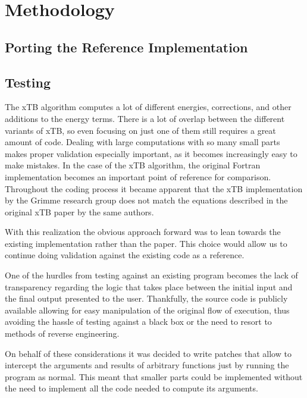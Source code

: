 \chapter{Methodology}

\section{Porting the Reference Implementation}

\section{Testing}

The xTB algorithm computes a lot of different energies, corrections, and other additions to the energy terms. There is a lot of overlap between the different variants of xTB, so even focusing on just one of them still requires a great amount of code.
Dealing with large computations with so many small parts makes proper validation especially important, as it becomes increasingly easy to make mistakes.
In the case of the xTB algorithm, the original Fortran implementation becomes an important point of reference for comparison. Throughout the coding process it became apparent that the xTB implementation by the Grimme research group does not match the equations described in the original xTB paper by the same authors.


With this realization the obvious approach forward was to lean towards the existing implementation rather than the paper. This choice would allow us to continue doing validation against the existing code as a reference.

One of the hurdles from testing against an existing program becomes the lack of transparency regarding the logic that takes place between the initial input and the final output presented to the user. Thankfully, the source code is publicly available allowing for easy manipulation of the original flow of execution, thus avoiding the hassle of testing against a black box or the need to resort to methods of reverse engineering.

On behalf of these considerations it was decided to write patches that allow to intercept the arguments and results of arbitrary functions just by running the program as normal. This meant that smaller parts could be implemented without the need to implement all the code needed to compute its arguments.

